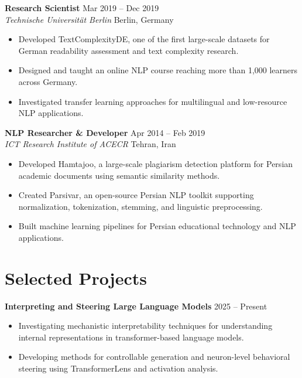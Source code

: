 \documentclass[11pt,a4paper]{article}
\newcommand{\cvitem}[1]{
    \item #1
}
\newcommand{\role}[4]{
    \textbf{#1} \hfill {\small #2} \\
    \textit{#3} \hfill {\small #4}
}
\begin{document}
\vspace{0.5em}

\role
{Research Scientist}
{Mar 2019 -- Dec 2019}
{Technische Universität Berlin}
{Berlin, Germany}

\begin{itemize}
    \cvitem{Developed TextComplexityDE, one of the first large-scale datasets for German readability assessment and text complexity research.}

    \cvitem{Designed and taught an online NLP course reaching more than 1,000 learners across Germany.}

    \cvitem{Investigated transfer learning approaches for multilingual and low-resource NLP applications.}
\end{itemize}


\vspace{0.5em}


\begin{samepage}

\role
{NLP Researcher \& Developer}
{Apr 2014 -- Feb 2019}
{ICT Research Institute of ACECR}
{Tehran, Iran}

\begin{itemize}
    \cvitem{Developed Hamtajoo, a large-scale plagiarism detection platform for Persian academic documents using semantic similarity methods.}

    \cvitem{Created Parsivar, an open-source Persian NLP toolkit supporting normalization, tokenization, stemming, and linguistic preprocessing.}

    \cvitem{Built machine learning pipelines for Persian educational technology and NLP applications.}
\end{itemize}
\end{samepage}

\vspace{0.7em}

\section*{Selected Projects}

\textbf{Interpreting and Steering Large Language Models} \hfill 2025 -- Present

\begin{itemize}
    \cvitem{Investigating mechanistic interpretability techniques for understanding internal representations in transformer-based language models.}

    \cvitem{Developing methods for controllable generation and neuron-level behavioral steering using TransformerLens and activation analysis.}
\end{itemize}
\end{document}
